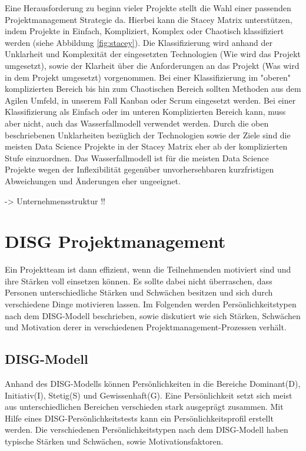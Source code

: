 \documentclass[twocolumn,10pt]{asme2ej}
\begin{document}
Eine Herausforderung zu beginn vieler Projekte stellt die Wahl einer passenden Projektmanagement Strategie da. Hierbei kann die Stacey Matrix \cite{Stacey2011StrategicMA} unterstützen, indem Projekte in Einfach, Kompliziert, Komplex oder Chaotisch klassifiziert werden (siehe Abbildung \ref{fig:stacey}). Die Klassifizierung wird anhand der Unklarheit und Komplexität der eingesetzten Technologien (Wie wird das Projekt umgesetzt), sowie der Klarheit über die Anforderungen an das Projekt (Was wird in dem Projekt umgesetzt) vorgenommen. Bei einer Klassifizierung im "oberen" komplizierten Bereich bis hin zum Chaotischen Bereich sollten Methoden aus dem Agilen Umfeld, in unserem Fall Kanban oder Scrum eingesetzt werden. Bei einer Klassifizierung als Einfach oder im unteren Komplizierten Bereich kann, muss aber nicht, auch das Wasserfallmodell verwendet werden. Durch die oben beschriebenen Unklarheiten bezüglich der Technologien sowie der Ziele sind die meisten Data Science Projekte in der Stacey Matrix eher ab der komplizierten Stufe einzuordnen. Das Wasserfallmodell ist für die meisten Data Science Projekte wegen der Inflexibilität gegenüber unvorhersehbaren kurzfristigen Abweichungen und Änderungen  eher ungeeignet.

-> Unternehmensstruktur !!

\section{DISG Projektmanagement}\label{sec:2}
Ein Projektteam ist dann effizient, wenn die Teilnehmenden motiviert sind und ihre Stärken voll einsetzen können. Es sollte dabei nicht überraschen, dass Personen unterschiedliche Stärken und Schwächen besitzen und sich durch verschiedene Dinge motivieren lassen. Im Folgenden werden Persönlichkeitstypen nach dem DISG-Modell beschrieben, sowie diskutiert wie sich Stärken, Schwächen und Motivation derer in verschiedenen Projektmanagement-Prozessen verhält.

\subsection{DISG-Modell}
Anhand des DISG-Modells \cite{disc} können Persönlichkeiten in die Bereiche Dominant(D), Initiativ(I), Stetig(S) und Gewissenhaft(G). Eine Persönlichkeit setzt sich meist aus unterschiedlichen Bereichen verschieden stark ausgeprägt zusammen. Mit Hilfe eines DISG-Persönlichkeitstests kann ein Persönlichkeitsprofil erstellt werden. Die verschiedenen Persönlichkeitstypen nach dem DISG-Modell haben typische Stärken und Schwächen, sowie Motivationsfaktoren. 
\end{document}
